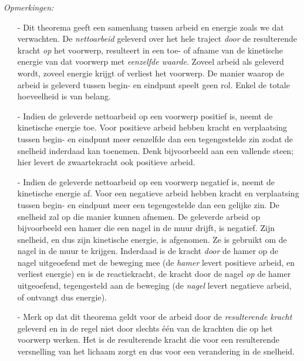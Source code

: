 \documentclass{ximera}
\begin{document}
	\textit{Opmerkingen:}
	\begin{enumerate}
	\item[-]Dit theorema geeft een samenhang tussen arbeid en energie
	zoals we dat verwachten. De \textit{nettoarbeid} geleverd over het hele traject \textit{door} de resulterende kracht \textit{op} het voorwerp, resulteert in een toe- of afname van de
	kinetische energie van dat voorwerp met \textit{eenzelfde waarde}.
	Zoveel arbeid als geleverd wordt, zoveel energie krijgt of verliest het voorwerp. De manier waarop de arbeid is geleverd tussen begin- en eindpunt speelt geen rol. Enkel de totale hoeveelheid is van belang.
	
	\item[-]Indien de geleverde nettoarbeid op een voorwerp positief is, neemt de
	kinetische energie toe. Voor positieve arbeid hebben kracht en
	verplaatsing tussen begin- en eindpunt meer eenzelfde dan een
	tegengestelde zin zodat de snelheid inderdaad kan toenemen. Denk bijvoorbeeld aan een vallende steen; hier levert de zwaartekracht ook positieve arbeid.
	\item[-]Indien de geleverde nettoarbeid op een
	voorwerp negatief is, neemt de kinetische energie af. Voor een
	negatieve arbeid hebben kracht en verplaatsing tussen begin- en
	eindpunt meer een tegengestelde dan een gelijke zin. De snelheid zal op die manier kunnen afnemen. De geleverde arbeid op
	bij\-voor\-beeld een hamer die een nagel in de muur drijft, is
	negatief. Zijn snelheid, en dus zijn kinetische energie, is
	afgenomen. Ze is gebruikt om de nagel in de muur te krijgen.
	Inderdaad is de kracht \textit{door} de hamer op de nagel
	uitgeoefend met de beweging mee (de \textit{hamer} levert positieve arbeid, en verliest energie) en is de reactiekracht, de kracht door de nagel \textit{op} de hamer uitgeoefend, tegengesteld
	aan de beweging (de \textit{nagel} levert negatieve arbeid, of ontvangt dus energie).
	\item[-]Merk op dat dit theorema geldt voor de arbeid door de
	\textit{resulterende kracht} geleverd en in de regel niet door
	slechts \'e\'en van de krachten die op het voorwerp werken. Het is
	de resulterende kracht die voor een resulterende versnelling van het
	lichaam zorgt en dus voor een verandering in de snelheid.
	\end{enumerate}
	
\end{document}
